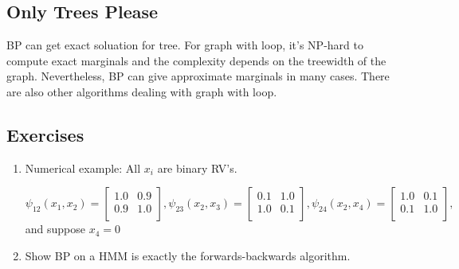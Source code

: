 \documentclass{harvardml}
\theoremstyle{definition}
\theoremstyle{plain}
\theoremstyle{definition}
\theoremstyle{remark}
\begin{document}
\subsection{Only Trees Please}
BP can get exact soluation for tree. For graph with loop, it's NP-hard to compute exact marginals and the complexity depends on the treewidth of the graph. Nevertheless, BP can give approximate marginals in many cases. There are also other algorithms dealing with graph with loop.


\subsection{Exercises}
\begin{enumerate}
    \item Numerical example: All $x_i$ are binary RV's.
    \medskip 
    \begin{center}
    \end{center}

$\psi_{12}(x_1, x_2) = \begin{bmatrix}
1.0 & 0.9\\
0.9 & 1.0\\
\end{bmatrix}, \psi_{23}(x_2, x_3) = \begin{bmatrix}
0.1 & 1.0\\
1.0 & 0.1\\
\end{bmatrix},\psi_{24}(x_2, x_4) = \begin{bmatrix}
1.0 & 0.1\\
0.1 & 1.0\\
\end{bmatrix},$ and suppose $x_4=0$
    
    
\item Show BP on a HMM is exactly the forwards-backwards algorithm. 
\end{enumerate}
\end{document}
